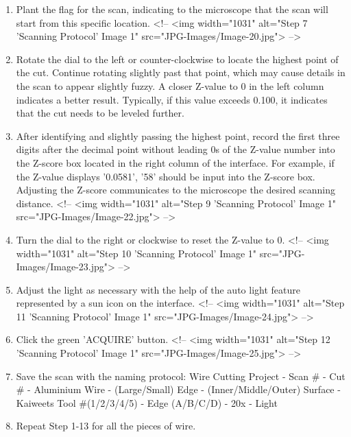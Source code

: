 \documentclass[fleqn,10pt]{wlscirep}
\begin{document}
\begin{enumerate}
  \item
  Plant the flag for the scan, indicating to the microscope that the scan will start from this specific location.
<!-- <img width="1031" alt="Step 7 'Scanning Protocol' Image 1" src="JPG-Images/Image-20.jpg"> -->

  \item
  Rotate the dial to the left or counter-clockwise to locate the highest point of the cut. Continue rotating slightly past that point, which may cause details in the scan to appear slightly fuzzy. A closer Z-value to 0 in the left column indicates a better result. Typically, if this value exceeds 0.100, it indicates that the cut needs to be leveled further.

  \item
  After identifying and slightly passing the highest point, record the first three digits after the decimal point without leading 0s of the Z-value number into the Z-score box located in the right column of the interface. For example, if the Z-value displays '0.0581', '58' should be input into the Z-score box. Adjusting the Z-score communicates to the microscope the desired scanning distance.
<!-- <img width="1031" alt="Step 9 'Scanning Protocol' Image 1" src="JPG-Images/Image-22.jpg"> -->

  \item
  Turn the dial to the right or clockwise to reset the Z-value to 0.
<!-- <img width="1031" alt="Step 10 'Scanning Protocol' Image 1" src="JPG-Images/Image-23.jpg"> -->

  \item
  Adjust the light as necessary with the help of the auto light feature represented by a sun icon on the interface.
<!-- <img width="1031" alt="Step 11 'Scanning Protocol' Image 1" src="JPG-Images/Image-24.jpg"> -->

  \item
  Click the green 'ACQUIRE' button.
<!-- <img width="1031" alt="Step 12 'Scanning Protocol' Image 1" src="JPG-Images/Image-25.jpg"> -->

  \item
  Save the scan with the naming protocol: Wire Cutting Project - Scan \# - Cut \# - Aluminium Wire - (Large/Small) Edge - (Inner/Middle/Outer) Surface - Kaiweets Tool \#(1/2/3/4/5)  - Edge (A/B/C/D) - 20x - Light %

  \item
  Repeat Step 1-13 for all the pieces of wire.
\end{enumerate}
\end{document}
